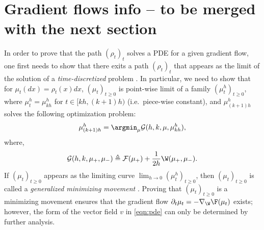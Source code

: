 
\section{Gradient flows info -- to be merged with the next section}

In order to prove that the path $(\rho_t)_t$ solves a PDE for a given gradient flow, one first needs to show that there exits a path $(\rho_t)_t$ that appears as the limit of the solution of a \emph{time-discretized} problem \cite{jordan1998variational,santambrogio2017euclidean}. In particular, we need to show that for $\mu_t(dx) = \rho_t(x)dx$, $(\mu_t)_{t\geq 0}$ is point-wise limit of a family $(\mu_t^h)_{t\geq 0}$, where $\mu_t^h = \mu_{kh}^h$ for $t \in [kh, (k+1)h)$ (i.e.\ piece-wise constant), and $\mu_{(k+1)h}^h$ solves the following optimization problem:
\begin{align}
\mu^{h}_{(k+1)h} = \argmin_\mu \mathcal{G}(h, k , \mu, \mu^h_{kh}),  %
\end{align} 
where,
\begin{align}
\mathcal{G}(h, k , \mu_+, \mu_-) \triangleq \mathcal{F}(\mu_+) + \frac{1}{2h}\W(\mu_+, \mu_-).
\end{align}
If $(\mu_t)_{t\geq 0}$ appears as the limiting curve $\lim_{h\rightarrow 0}(\mu_t^h)_{t\geq 0}$, then $(\mu_t)_{t\geq 0}$ is called a \emph{generalized minimizing movement} \cite{santambrogio2017euclidean,bonnotte2013unidimensional}. Proving that $(\mu_t)_{t\geq 0}$ is a minimizing movement ensures that the gradient flow $\partial_t \mu_t = - \nabla_{\W} \F(\mu_t)$ exists; however, the form of the vector field $v$ in \eqref{eqn:pde} can only be determined by further analysis.